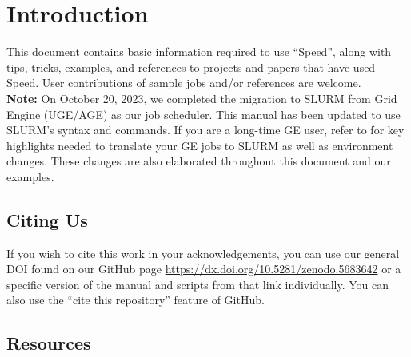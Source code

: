 \documentclass{easychair}
\begin{document}
\tableofcontents
\clearpage

\section{Introduction}
\label{sect:introduction}

This document contains basic information required to use ``Speed'', along with tips, 
tricks, examples, and references to projects and papers that have used Speed.
User contributions of sample jobs and/or references are welcome.\\

\noindent
\textbf{Note:} On October 20, 2023, we completed the migration to SLURM 
from Grid Engine (UGE/AGE) as our job scheduler. 
This manual has been updated to use SLURM's syntax and commands. 
If you are a long-time GE user, refer to  for key highlights needed to 
translate your GE jobs to SLURM as well as environment changes. 
These changes are also elaborated throughout this document and our examples.

\subsection{Citing Us}
\label{sect:citing-speed-hpc}

If you wish to cite this work in your acknowledgements, you can use our general DOI found on our GitHub page
\url{https://dx.doi.org/10.5281/zenodo.5683642} or a specific version of the manual and scripts from that link individually.
You can also use the ``cite this repository'' feature of GitHub.

\subsection{Resources}
\label{sect:resources}
\end{document}
